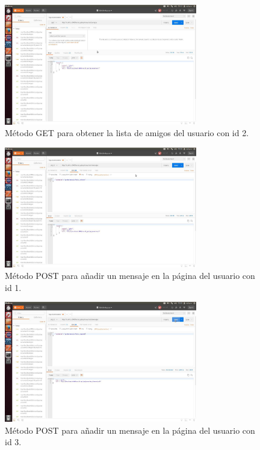 \documentclass[12pt,a4paper, spanish]{article}
\begin{document}

\begin{figure}[H]
	\centering
	\includegraphics[width=0.75\textwidth]{images/captura20.jpg}
	\caption{Método GET para obtener la lista de amigos del usuario con id 2.}
\end{figure}

\begin{figure}[H]
	\centering
	\includegraphics[width=0.75\textwidth]{images/captura21.jpg}
	\caption{Método POST para añadir un mensaje en la página del usuario con id 1.}
\end{figure}

\begin{figure}[H]
	\centering
	\includegraphics[width=0.75\textwidth]{images/captura22.jpg}
	\caption{Método POST para añadir un mensaje en la página del usuario con id 3.}
\end{figure}
\end{document}
